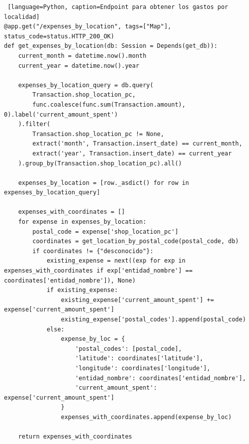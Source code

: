 \begin{lstlisting} [language=Python, caption=Endpoint para obtener los gastos por localidad]
@app.get("/expenses_by_location", tags=["Map"], status_code=status.HTTP_200_OK)
def get_expenses_by_location(db: Session = Depends(get_db)):
    current_month = datetime.now().month
    current_year = datetime.now().year

    expenses_by_location_query = db.query(
        Transaction.shop_location_pc,
        func.coalesce(func.sum(Transaction.amount), 0).label('current_amount_spent')
    ).filter(
        Transaction.shop_location_pc != None,
        extract('month', Transaction.insert_date) == current_month,
        extract('year', Transaction.insert_date) == current_year
    ).group_by(Transaction.shop_location_pc).all()

    expenses_by_location = [row._asdict() for row in expenses_by_location_query]

    expenses_with_coordinates = []
    for expense in expenses_by_location:
        postal_code = expense['shop_location_pc']
        coordinates = get_location_by_postal_code(postal_code, db)
        if coordinates != {"desconocido"}:
            existing_expense = next((exp for exp in expenses_with_coordinates if exp['entidad_nombre'] == coordinates['entidad_nombre']), None)
            if existing_expense:
                existing_expense['current_amount_spent'] += expense['current_amount_spent']
                existing_expense['postal_codes'].append(postal_code)
            else:
                expense_by_loc = {
                    'postal_codes': [postal_code],
                    'latitude': coordinates['latitude'],
                    'longitude': coordinates['longitude'],
                    'entidad_nombre': coordinates['entidad_nombre'],
                    'current_amount_spent': expense['current_amount_spent']
                }
                expenses_with_coordinates.append(expense_by_loc)

    return expenses_with_coordinates
\end{lstlisting}

